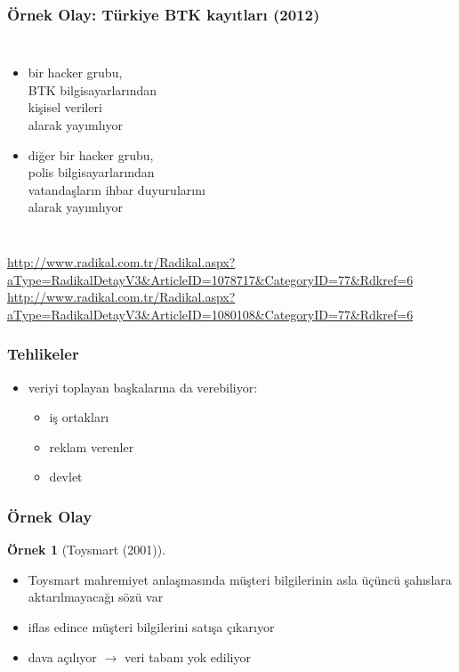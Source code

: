 \documentclass[dvipsnames]{beamer}
\theoremstyle{definition}
\theoremstyle{example}
\newtheorem{ornek}[theorem]{Örnek}
\theoremstyle{plain}
\begin{document}
\begin{frame}
  \frametitle{Örnek Olay: Türkiye BTK kayıtları (2012)}

  \begin{columns}

    \begin{itemize}
      \item bir hacker grubu,\\
        BTK bilgisayarlarından\\
        kişisel verileri\\
        alarak yayımlıyor
      \item diğer bir hacker grubu,\\
        polis bilgisayarlarından\\
        vatandaşların ihbar duyurularını\\
        alarak yayımlıyor
    \end{itemize}
  \end{columns}

  \medskip
  \tiny{\url{http://www.radikal.com.tr/Radikal.aspx?aType=RadikalDetayV3&ArticleID=1078717&CategoryID=77&Rdkref=6}}\\
  \tiny{\url{http://www.radikal.com.tr/Radikal.aspx?aType=RadikalDetayV3&ArticleID=1080108&CategoryID=77&Rdkref=6}}\\
\end{frame}

\begin{frame}
  \frametitle{Tehlikeler}

  \begin{itemize}
    \item veriyi toplayan başkalarına da verebiliyor:
    \begin{itemize}
      \item iş ortakları
      \item reklam verenler
      \item devlet
    \end{itemize}
  \end{itemize}
\end{frame}

\begin{frame}
  \frametitle{Örnek Olay}

  \begin{ornek}[Toysmart (2001)]
    \begin{itemize}
      \item Toysmart mahremiyet anlaşmasında müşteri bilgilerinin asla
        üçüncü şahıslara aktarılmayacağı sözü var
      \item iflas edince müşteri bilgilerini satışa çıkarıyor
      \item dava açılıyor $\rightarrow$ veri tabanı yok ediliyor
    \end{itemize}
  \end{ornek}
\end{frame}
\end{document}
